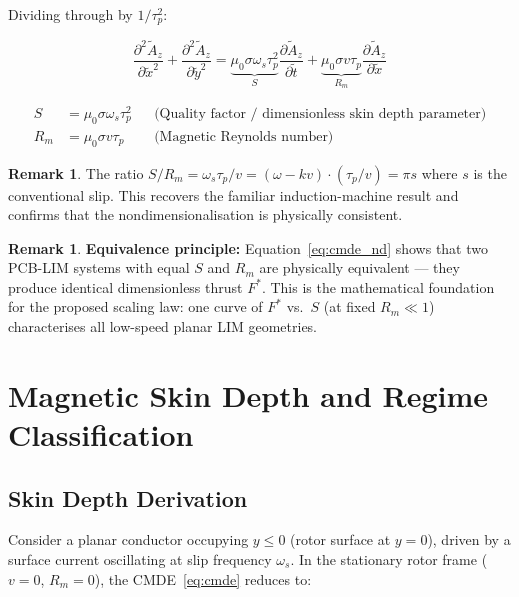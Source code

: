 \documentclass[12pt, a4paper]{article}
\theoremstyle{plain}
\theoremstyle{definition}
\newtheorem{remark}[theorem]{Remark}
\newcommand{\taup}{\tau_p}
\newcommand{\oms}{\omega_s}
\newcommand{\sig}{\sigma}
\newcommand{\muZ}{\mu_0}
\newcommand{\Rm}{R_m}
\newcommand{\Fstar}{F^*}
\newcommand{\Der}[2]{\frac{\partial #1}{\partial #2}}
\newcommand{\DDer}[2]{\frac{\partial^2 #1}{\partial #2^2}}
\begin{document}
Dividing through by $1/\taup^2$:

\begin{equation}
  \DDer{\tilde{A}_z}{\tilde{x}} + \DDer{\tilde{A}_z}{\tilde{y}}
  = \underbrace{\muZ\sig\oms\taup^2}_{\displaystyle S}
    \Der{\tilde{A}_z}{\tilde{t}}
  + \underbrace{\muZ\sig v\taup}_{\displaystyle \Rm}
    \Der{\tilde{A}_z}{\tilde{x}}
  \label{eq:cmde_nd}
\end{equation}

\begin{tcolorbox}[colback=green!5, colframe=green!50,
  title=\textbf{The Two Governing Dimensionless Groups}]
\begin{align}
  S &= \muZ\sig\oms\taup^2
     && \text{(Quality factor / dimensionless skin depth parameter)} \label{eq:Sdef}\\
  \Rm &= \muZ\sig v\taup
     && \text{(Magnetic Reynolds number)} \label{eq:Rmdef}
\end{align}
\end{tcolorbox}

\begin{remark}
  The ratio $S/\Rm = \oms\taup/v = (\omega - kv)\cdot(\taup/v) = \pi s$ where $s$
  is the conventional slip. This recovers the familiar induction-machine result and
  confirms that the nondimensionalisation is physically consistent.
\end{remark}

\begin{remark}
  \textbf{Equivalence principle:} Equation~\eqref{eq:cmde_nd} shows that two PCB-LIM
  systems with equal $S$ and $\Rm$ are physically equivalent — they produce identical
  dimensionless thrust $\Fstar$. This is the mathematical foundation for the proposed
  scaling law: one curve of $\Fstar$ vs.\ $S$ (at fixed $\Rm \ll 1$) characterises
  all low-speed planar LIM geometries.
\end{remark}

\section{Magnetic Skin Depth and Regime Classification}
\label{sec:skindepth}

\subsection{Skin Depth Derivation}

Consider a planar conductor occupying $y \leq 0$ (rotor surface at $y=0$), driven by a
surface current oscillating at slip frequency $\oms$. In the stationary rotor frame
($v=0$, $\Rm = 0$), the CMDE~\eqref{eq:cmde} reduces to:
\end{document}
